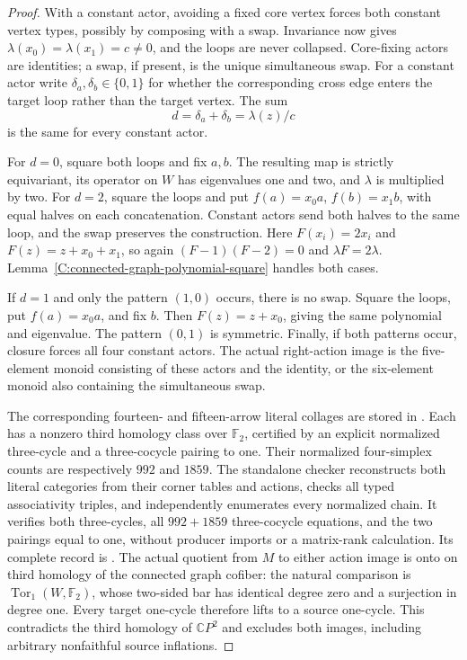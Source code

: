 \begin{proof}
With a constant actor, avoiding a fixed core vertex forces
both constant vertex types, possibly by composing with a
swap. Invariance now gives
$\lambda(x_0)=\lambda(x_1)=c\ne0$, and the loops are
never collapsed. Core-fixing actors are identities; a swap,
if present, is the unique simultaneous swap.
For a constant actor write $\delta_a,\delta_b\in\{0,1\}$
for whether the corresponding cross edge enters the target
loop rather than the target vertex. The sum
\[
 d=\delta_a+\delta_b=\lambda(z)/c
\]
is the same for every constant actor.

For $d=0$, square both loops and fix $a,b$. The resulting
map is strictly equivariant, its operator on $W$ has
eigenvalues one and two, and $\lambda$ is multiplied by
two. For $d=2$, square the loops and put
$f(a)=x_0a$, $f(b)=x_1b$, with equal halves on each
concatenation. Constant actors send both halves to the
same loop, and the swap preserves the construction.
Here $F(x_i)=2x_i$ and $F(z)=z+x_0+x_1$, so again
$(F-1)(F-2)=0$ and $\lambda F=2\lambda$.
Lemma~\ref{C:connected-graph-polynomial-square} handles
both cases.

If $d=1$ and only the pattern $(1,0)$ occurs, there is
no swap. Square the loops, put $f(a)=x_0a$, and fix $b$.
Then $F(z)=z+x_0$, giving the same polynomial and eigenvalue.
The pattern $(0,1)$ is symmetric.
Finally, if both patterns occur, closure forces all four
constant actors. The actual right-action image is the
five-element monoid consisting of these actors and the
identity, or the six-element monoid also containing the
simultaneous swap.

The corresponding fourteen- and fifteen-arrow literal
collages are stored in
.
Each has a nonzero third homology class over $\mathbb F_2$,
certified by an explicit normalized three-cycle and a
three-cocycle pairing to one. Their normalized four-simplex
counts are respectively $992$ and $1859$.
The standalone checker
 reconstructs both
literal categories from their corner tables and actions,
checks all typed associativity triples, and independently
enumerates every normalized chain. It verifies both
three-cycles, all $992+1859$ three-cocycle equations, and
the two pairings equal to one, without producer imports
or a matrix-rank calculation. Its complete record is
.
The actual quotient from $M$ to either action image is
onto on third homology of the connected graph cofiber:
the natural comparison is $\operatorname{Tor}_1(W,\mathbb F_2)$,
whose two-sided bar has identical degree zero and a
surjection in degree one. Every target one-cycle therefore
lifts to a source one-cycle. This contradicts the third
homology of $\mathbb CP^2$ and excludes both images,
including arbitrary nonfaithful source inflations.


\end{proof}
